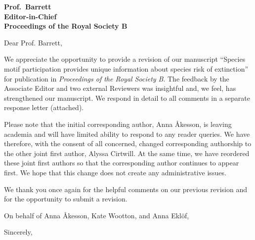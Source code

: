 \documentclass[12pt]{letter}
\begin{document}
\begin{letter}{\bf
Prof.~Barrett\\
Editor-in-Chief\\
Proceedings of the Royal Society B} %


\opening{Dear Prof. Barrett,}

We appreciate the opportunity to provide a revision of our manuscript ``Species motif participation provides unique information about species risk of extinction'' for publication in \emph{Proceedings of the Royal Society B}. 
The feedback by the Associate Editor and two external Reviewers was insightful and, we feel, has strengthened our manuscript.
We respond in detail to all comments in a separate response letter (attached).


Please note that the initial corresponding author, Anna \r{A}kesson, is leaving academia and will have limited ability to respond to any reader queries.
We have therefore, with the consent of all concerned, changed corresponding authorship to the other joint first author, Alyssa Cirtwill.
At the same time, we have reordered these joint first authors so that the corresponding author continues to appear first.
We hope that this change does not create any administrative issues.


We thank you once again for the helpful comments on our previous revision and for the opportunity to submit a revision.

On behalf of Anna {\AA}kesson, Kate Wootton, and Anna Ekl\"of,

\closing{Sincerely,}
\vspace{4\parskip}
\centering


\end{letter} 
\end{document}
